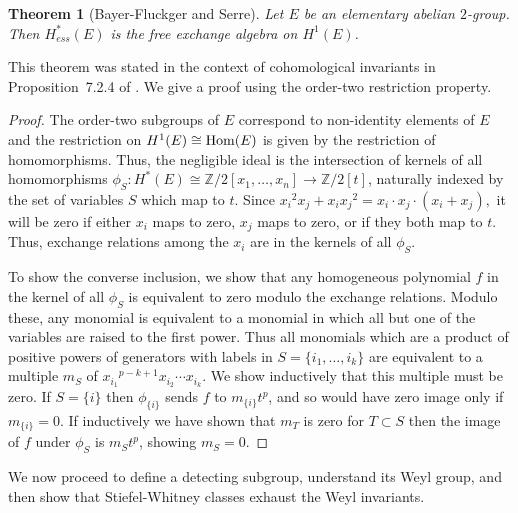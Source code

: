 \documentclass{article}
\theoremstyle{plain}
\newtheorem{theorem}{Theorem}
\theoremstyle{definition}
\newcommand{\Z}{\mathbb{Z}}
\begin{document}
\begin{theorem}[Bayer-Fluckger and Serre]\label{elemabelian}
Let $E$ be an elementary abelian $2$-group.  Then $H^*_{ess}(E )$ is the free exchange algebra on $H^1(E )$. 
\end{theorem}

This theorem was stated in the context of cohomological
invariants in Proposition~7.2.4 of \cite{B-FS94}. We give a 
proof using  the order-two restriction property.

\begin{proof} 
The order-two subgroups of $E$ correspond to non-identity elements of $E$ and the restriction on $H^1(E ) \cong {\rm Hom}(E )$ is given by the restriction of homomorphisms. Thus, the  negligible ideal is the intersection
of kernels of all homomorphisms $\phi_S : H^*(E ) \cong \Z/2[x_1, \ldots, x_n] \to \Z/2[t]$, naturally indexed by the set of variables $S$ which
map to $t$.   Since ${x_i}^2 x_j + x_i {x_j}^2 = x_i \cdot x_j \cdot (x_i + x_j),$ it will be zero if either $x_i$ maps to zero, $x_j$ maps to zero, or if they both map to $t$.  Thus,  exchange relations among
the $x_i$ are in 
the kernels of all $\phi_S$.

To show the converse inclusion, 
we show that any homogeneous
polynomial $f$ in the kernel of all $\phi_S$ 
is equivalent to 
zero modulo the exchange relations.  
Modulo these, any monomial is equivalent to a monomial
in which all but one of the variables 
are raised to the first
power.  Thus all monomials which are a product of
positive powers of generators with labels in
$ S = \{ i_1, \ldots, i_k \} $ are equivalent to a multiple $m_S$ of
${x_{i_1}}^{p-k+1} x_{i_2} \cdots x_{i_k}$.  We show inductively
that this multiple must be zero.  If $S = \{ i \}$ 
then $\phi_{\{i\}}$  sends $f$ to $m_{\{i\}} t^p$, and so would have zero image only if $m_{\{i\}} = 0$.  If inductively we have 
shown that $m_T$ is zero for $T \subset S$ then the image of $f$ under $\phi_S$
is $m_S t^p$, showing $m_S = 0$.
\end{proof}


We now proceed to define a detecting subgroup, understand its
Weyl group, and then show that Stiefel-Whitney
classes exhaust the Weyl invariants.
\end{document}
